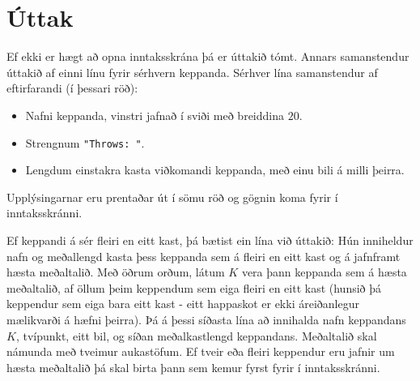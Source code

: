 \pagebreak
\section*{Úttak}
Ef ekki er hægt að opna inntaksskrána þá er úttakið tómt.
Annars samanstendur úttakið af einni línu fyrir sérhvern keppanda.
Sérhver lína samanstendur af eftirfarandi (í þessari röð):
\begin{itemize}
\item Nafni keppanda, vinstri jafnað í sviði með breiddina $20$.
\item Strengnum \texttt{"Throws: "}.
\item Lengdum einstakra kasta viðkomandi keppanda, með einu bili á milli þeirra.
\end{itemize}
Upplýsingarnar eru prentaðar út í sömu röð og gögnin koma fyrir í inntaksskránni.

Ef keppandi á sér fleiri en eitt kast, þá bætist ein lína við úttakið:
Hún inniheldur nafn og meðallengd kasta
þess keppanda sem á fleiri en eitt kast og á jafnframt hæsta meðaltalið.
Með öðrum orðum, látum $K$ vera þann keppanda sem á hæsta meðaltalið,
af öllum þeim keppendum sem eiga fleiri en eitt kast
(hunsið þá keppendur sem eiga bara eitt kast - eitt happaskot er ekki áreiðanlegur mælikvarði á hæfni þeirra).
Þá á þessi síðasta lína að innihalda nafn keppandans $K$,
tvípunkt, eitt bil, og síðan meðalkastlengd keppandans.
Meðaltalið skal námunda með tveimur aukastöfum.
Ef tveir eða fleiri keppendur eru jafnir um hæsta meðaltalið
þá skal birta þann sem kemur fyrst fyrir í inntaksskránni.

